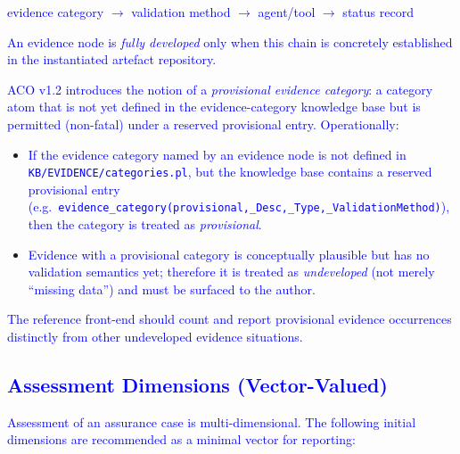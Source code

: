 \documentclass[11pt]{article}
\begin{document}
\begin{center}
\textcolor{blue}{evidence category $\rightarrow$ validation method $\rightarrow$ agent/tool $\rightarrow$ status record}
\end{center}

\textcolor{blue}{An evidence node is \emph{fully developed} only when this chain is concretely established in the instantiated artefact repository.}

\textcolor{blue}{ACO v1.2 introduces the notion of a \emph{provisional evidence category}: a category atom that is not yet defined in the evidence-category knowledge base but is permitted (non-fatal) under a reserved provisional entry. Operationally:}
\begin{itemize}[leftmargin=2em]
  \item \textcolor{blue}{If the evidence category named by an evidence node is not defined in \texttt{KB/\allowbreak EVIDENCE/\allowbreak categories.pl}, but the knowledge base contains a reserved provisional entry (e.g.\ \texttt{evidence\_category(provisional,\_Desc,\allowbreak\_Type,\allowbreak\_ValidationMethod)}), then the category is treated as \emph{provisional}.}
  \item \textcolor{blue}{Evidence with a provisional category is conceptually plausible but has no validation semantics yet; therefore it is treated as \emph{undeveloped} (not merely ``missing data'') and must be surfaced to the author.}
\end{itemize}

\textcolor{blue}{The reference front-end should count and report provisional evidence occurrences distinctly from other undeveloped evidence situations.}

\subsection{\textcolor{blue}{Assessment Dimensions (Vector-Valued)}}

\textcolor{blue}{Assessment of an assurance case is multi-dimensional. The following initial dimensions are recommended as a minimal vector for reporting:}
\end{document}
